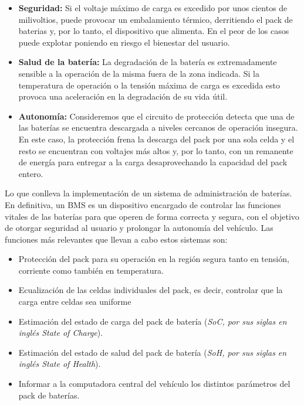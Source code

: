 \documentclass[10pt,a4paper]{article}
\begin{document}
	\begin{itemize}
		\item \textbf{Seguridad:} Si el voltaje máximo de carga es excedido por 
        unos cientos de milivoltios, puede provocar un embalamiento térmico, 
        derritiendo el pack de baterias y, por lo tanto, el dispositivo que 
        alimenta. En el peor de los casos puede explotar poniendo en riesgo el 
        bienestar del usuario.
		\item \textbf{Salud de la batería:} La degradación de la batería es 
        extremadamente sensible a la operación de la misma fuera de la zona 
        indicada. Si la temperatura de operación o la tensión máxima de carga 
        es excedida esto provoca una aceleración en la degradación de su vida 
        útil.
		\item \textbf{Autonomía:} Consideremos que el circuito de protección 
        detecta que una de las baterías se encuentra descargada a niveles 
        cercanos de operación insegura. En este caso, la protección frena la 
        descarga del pack por una sola celda y el resto se encuentran con 
        voltajes más altos y, por lo tanto, con un remanente de energía para 
        entregar a la carga desaprovechando la capacidad del pack entero.
	\end{itemize}
    
    \noindent Lo que conlleva la implementación de un sistema de administración 
    de baterías. En definitiva, un BMS es un dispositivo encargado de controlar 
    las funciones vitales de las baterías para que operen de forma correcta y 
    segura, con el objetivo de otorgar seguridad al usuario y prolongar la 
    autonomía del vehículo. Las funciones más relevantes que llevan a cabo estos 
    sistemas son:
	
	\begin{itemize}
		\item Protección del pack para su operación en la región segura tanto 
            en tensión, corriente como también en temperatura.
		\item Ecualización de las celdas individuales del pack, es decir,
            controlar que la carga entre celdas sea uniforme
		\item Estimación del estado de carga del pack de batería 
            (\emph{SoC, por sus siglas en inglés State of Charge}).
		\item Estimación del estado de salud del pack de batería 
            (\emph{SoH, por sus siglas en inglés State of Health}).
		\item Informar a la computadora central del vehículo los distintos 
            parámetros del pack de baterías.
	\end{itemize}
\end{document}
